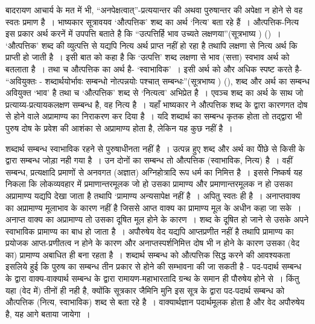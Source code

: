 बादरायण आचार्य के मत में भी, “अनपेक्षत्वात्”-प्रत्ययान्तर की अथवा पुरुषान्तर की अपेक्षा न होने से वह स्वतः प्रमाण है~। भाष्यकार सूत्रावयव ‘औत्पत्तिक' शब्द का अर्थ ‘नित्य' बता रहे हैं~। औत्पत्तिक-नित्य इस प्रकार अर्थ करनें में उपपत्ति बताते है कि “उत्पत्तिर्हि भाव उच्यते लक्षणया”(सूत्रभाष्य ) ()~। ‘औत्पत्तिक’ शब्द की व्युत्पत्ति से यद्यपि नित्य अर्थ प्राप्त नहीं हो रहा है तथापि लक्षणा से नित्य अर्थ कि प्राप्ती हो जाती है~। इसी बात को कहा है कि ‘उत्पत्ति' शब्द लक्षणा से भाव (सत्ता) स्वभाव अर्थ को बतलाता है~। तथा च औत्पत्तिक का अर्थ है- ‘स्वाभाविक'~। इसी अर्थ को और अधिक स्पष्ट करते है- “अवियुक्तः - शब्दार्थयोर्भावः सम्बन्धो नोत्पन्नयोः पश्चात् सम्बन्धः”(सूत्रभाष्य ) (), शब्द और अर्थ का सम्बन्ध अवियुक्त ‘भाव' है तथा च ‘औत्पत्तिक' शब्द से ‘नित्यत्व' अभिप्रेत है~। एवञ्च शब्द का अर्थ के साथ जो प्रत्याय्य-प्रत्यायकलक्षण सम्बन्ध है, वह नित्य है~। यहाँ भाष्यकार ने औत्पत्तिक शब्द के द्वारा कारणगत दोष से होने वाले अप्रामाण्य का निराकरण कर दिया है~। यदि शब्दार्थ का सम्बन्ध कृतक होता तो तद्द्वारा भी पुरुष दोष के प्रवेश की आशंका से अप्रामाण्य होता है, लेकिन यह कुछ नहीं है~। 

शब्दार्थ सम्बन्ध स्वाभाविक रहने से पुरुषाधीनता नहीं है~। उत्पन्न हुए शब्द और अर्थ का पीेछे से किसी के द्वारा सम्बन्ध जोड़ा नही गया है~। उन दोनों का सम्बन्ध तो औत्पत्तिक (स्वाभाविक, नित्य) है~। वहीं सम्बन्ध, प्रत्यक्षादि प्रमाणों से अनवगत (अज्ञात) अग्निहोत्रादि रूप धर्म का निमित्त है~। इससे निष्कर्ष यह निकला कि लोकव्यवहार में प्रमाणान्तरमूलक जो हो उसका प्रामाण्य और प्रमाणान्तरमूलक न हो उसका अप्रामाण्य यद्यपि देखा जाता है तथापि ‘प्रामाण्य अन्यसापेक्ष नहीं है~। अपितु स्वतः ही है~। अनाप्तवाक्य का अप्रामाण्य मूलाभाव के कारण नहीं है जिससे आप्त वाक्य का प्रामाण्य मूल के अधीन कहा जा सके~। अनाप्त वाक्य का अप्रामाण्य तो उसका दूषित मूल होने के कारण~। शब्द के दूषित हो जाने से उसके अपने स्वाभाविक प्रामाण्य का बाध हो जाता है~। अपौरुषेय वेद यद्यपि आप्तप्रणीत नहीं है तथापि प्रामाण्य का प्रयोजक आप्त-प्रणीतत्व न होने के कारण और अनाप्तस्पर्शनिमित्त दोष भी न होने के कारण उसका (वेद का) प्रामाण्य अबाधित ही बना रहता है~। शब्दार्थ सम्बन्ध को औत्पत्तिक सिद्ध करने की आवश्यकता इसलिये हुई कि पुरुष का सम्बन्ध तीन प्रकार से होने की सम्भावना की जा सकती है -  पद-पदार्थ सम्बन्ध के द्वारा  वाक्य-वाक्यार्थ सम्बन्ध के द्वारा  रामायण-महाभारतादि ग्रन्थ के समान ही पौरुषेय होने से~। किंतु यहा (वेद में) तीनों ही नही है, क्योंकि सूत्रकार जैमिनि मुनि इस सूत्र के द्वारा पद-पदार्थ सम्बन्ध को औत्पत्तिक (नित्य, स्वाभाविक) शब्द से बता रहे है~। वाक्यार्थज्ञान पदार्थमूलक होता है और वेद अपौरुषेय है, यह आगे बताया जायेगा~। 

